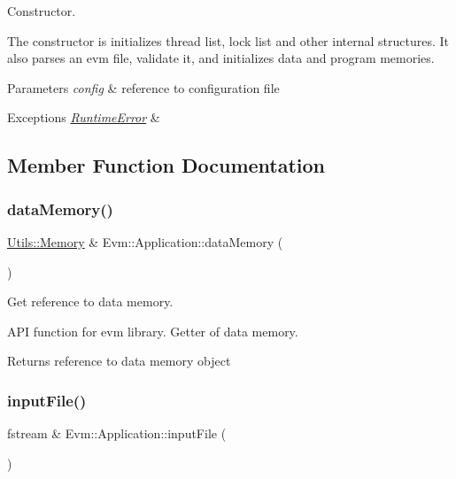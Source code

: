 Constructor. 

The constructor is initializes thread list, lock list and other internal structures. It also parses an evm file, validate it, and initializes data and program memories. 
\begin{DoxyParams}{Parameters}
{\em config} & reference to configuration file \\
\hline
\end{DoxyParams}

\begin{DoxyExceptions}{Exceptions}
{\em \mbox{\hyperlink{struct_evm_1_1_runtime_error}{Runtime\+Error}}} & \\
\hline
\end{DoxyExceptions}


\subsection{Member Function Documentation}
\mbox{\label{struct_evm_1_1_application_ae298c9f84fb6a0a4d51aa6ca39dce96a}} 
\subsubsection{\texorpdfstring{data\+Memory()}{dataMemory()}}
{\footnotesize\ttfamily \mbox{\hyperlink{struct_evm_1_1_utils_1_1_memory}{Utils\+::\+Memory}} \& Evm\+::\+Application\+::data\+Memory (\begin{DoxyParamCaption}{ }\end{DoxyParamCaption})}



Get reference to data memory. 

A\+PI function for evm library. Getter of data memory. \begin{DoxyReturn}{Returns}
reference to data memory object 
\end{DoxyReturn}
\mbox{\label{struct_evm_1_1_application_a9cb5d822b96435dd1e48f02e3a14e66a}} 
\subsubsection{\texorpdfstring{input\+File()}{inputFile()}}
{\footnotesize\ttfamily fstream \& Evm\+::\+Application\+::input\+File (\begin{DoxyParamCaption}{ }\end{DoxyParamCaption})}




